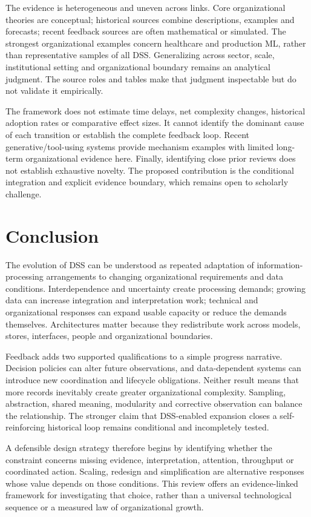 \documentclass[journal]{IEEEtran}
\begin{document}
The evidence is heterogeneous and uneven across links. Core organizational theories are conceptual; historical sources combine descriptions, examples and forecasts; recent feedback sources are often mathematical or simulated. The strongest organizational examples concern healthcare and production ML, rather than representative samples of all DSS. Generalizing across sector, scale, institutional setting and organizational boundary remains an analytical judgment. The source roles and tables make that judgment inspectable but do not validate it empirically.

The framework does not estimate time delays, net complexity changes, historical adoption rates or comparative effect sizes. It cannot identify the dominant cause of each transition or establish the complete feedback loop. Recent generative/tool-using systems provide mechanism examples with limited long-term organizational evidence here. Finally, identifying close prior reviews does not establish exhaustive novelty. The proposed contribution is the conditional integration and explicit evidence boundary, which remains open to scholarly challenge.

\section{Conclusion}
The evolution of DSS can be understood as repeated adaptation of information-processing arrangements to changing organizational requirements and data conditions. Interdependence and uncertainty create processing demands; growing data can increase integration and interpretation work; technical and organizational responses can expand usable capacity or reduce the demands themselves. Architectures matter because they redistribute work across models, stores, interfaces, people and organizational boundaries.

Feedback adds two supported qualifications to a simple progress narrative. Decision policies can alter future observations, and data-dependent systems can introduce new coordination and lifecycle obligations. Neither result means that more records inevitably create greater organizational complexity. Sampling, abstraction, shared meaning, modularity and corrective observation can balance the relationship. The stronger claim that DSS-enabled expansion closes a self-reinforcing historical loop remains conditional and incompletely tested.

A defensible design strategy therefore begins by identifying whether the constraint concerns missing evidence, interpretation, attention, throughput or coordinated action. Scaling, redesign and simplification are alternative responses whose value depends on those conditions. This review offers an evidence-linked framework for investigating that choice, rather than a universal technological sequence or a measured law of organizational growth.
\end{document}
